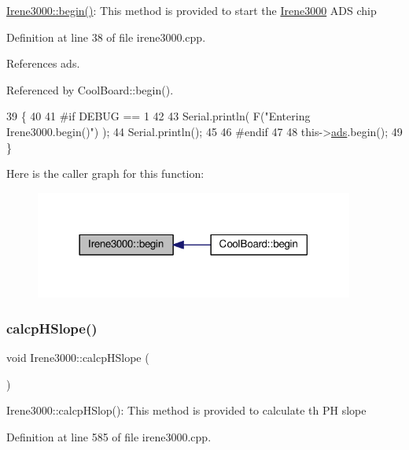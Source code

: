 \hyperlink{classIrene3000_ad5891806c500ae1007afe52b9e304c2b}{Irene3000\+::begin()}\+: This method is provided to start the \hyperlink{classIrene3000}{Irene3000} A\+DS chip 

Definition at line 38 of file irene3000.\+cpp.



References ads.



Referenced by Cool\+Board\+::begin().


\begin{DoxyCode}
39 \{
40 
41 \textcolor{preprocessor}{#if DEBUG == 1 }
42 
43     Serial.println( F(\textcolor{stringliteral}{"Entering Irene3000.begin()"}) );
44     Serial.println();
45 
46 \textcolor{preprocessor}{#endif}
47 
48     this->\hyperlink{classIrene3000_a1215e77ba761c9908d80d691f149e135}{ads}.begin();
49 \}
\end{DoxyCode}
Here is the caller graph for this function\+:\nopagebreak
\begin{figure}[H]
\begin{center}
\leavevmode
\includegraphics[width=297pt]{classIrene3000_ad5891806c500ae1007afe52b9e304c2b_icgraph}
\end{center}
\end{figure}
\mbox{\label{classIrene3000_a81f6a79e546679692053f7ac1af49613}} 
\subsubsection{\texorpdfstring{calcp\+H\+Slope()}{calcpHSlope()}}
{\footnotesize\ttfamily void Irene3000\+::calcp\+H\+Slope (\begin{DoxyParamCaption}{ }\end{DoxyParamCaption})}

Irene3000\+::calcp\+H\+Slop()\+: This method is provided to calculate th PH slope 

Definition at line 585 of file irene3000.\+cpp.



